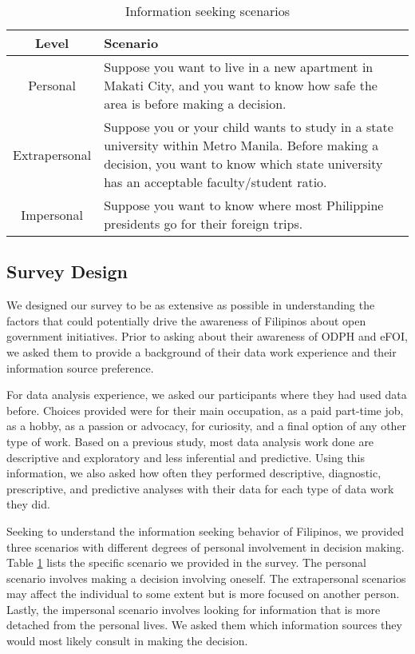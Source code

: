 \documentclass{sigchi}
\begin{document}
\begin{table}[t]
    \centering
    \begin{tabular}{|c|p{5.5cm}|}
         \hline
         \textbf{Level} & \textbf{Scenario}  \\
         \hline
         Personal &  Suppose you want to live in a new apartment in Makati City, and you want to know how safe the area is before making a decision.\\
         \hline
         Extrapersonal & Suppose you or your child wants to study in a state university within Metro Manila. Before making a decision, you want to know which state university has an acceptable faculty/student ratio.\\
         \hline
         Impersonal & Suppose you want to know where most Philippine presidents go for their foreign trips.\\
         \hline
    \end{tabular}
    \caption{Information seeking scenarios}
    \label{tab:scenarios}
\end{table}

\subsection{Survey Design}
We designed our survey to be as extensive as possible in understanding the factors that could potentially drive the awareness of Filipinos about open government initiatives. Prior to asking about their awareness of ODPH and eFOI, we asked them to provide a background of their data work experience and their information source preference. 

For data analysis experience, we asked our participants where they had used data before. Choices provided were for their main occupation, as a paid part-time job, as a hobby, as a passion or advocacy, for curiosity, and a final option of any other type of work. Based on a previous study, most data analysis work done are descriptive and exploratory and less inferential and predictive\cite{choi2017characteristics}. Using this information, we also asked how often they performed descriptive, diagnostic,  prescriptive, and predictive analyses with their data for each type of data work they did.

Seeking to understand the information seeking behavior of Filipinos, we provided three scenarios with different degrees of personal involvement in decision making. Table \ref{tab:scenarios} lists the specific scenario we provided in the survey. The personal scenario involves making a decision involving oneself. The extrapersonal scenarios may affect the individual to some extent but is more focused on another person. Lastly, the impersonal scenario involves looking for information that is more detached from the personal lives. We asked them which information sources they would most likely consult in making the decision.
\end{document}
